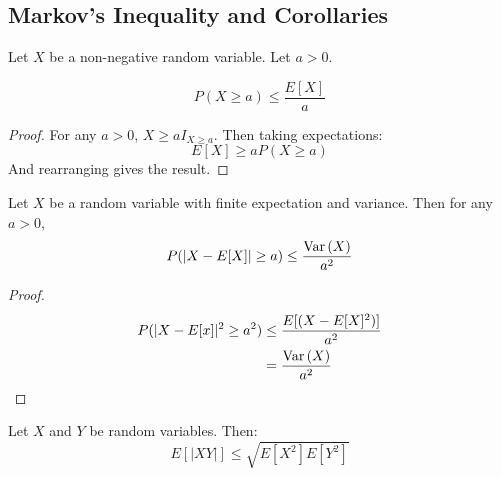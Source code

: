 \documentclass[../Main.tex]{subfiles}
\begin{document}
\subsection{Markov's Inequality and Corollaries}
\begin{theorem}
    Let $X$ be a non-negative random variable. Let $a > 0$.\par
    \begin{equation*}
        P(X \geq a) \leq \frac{E[X]}{a}
    \end{equation*}
\end{theorem}
\begin{proof}
    For any $a > 0$, $X \geq a I_{X \geq a}$. Then taking expectations:
    \begin{equation*}
        E[X] \geq a P(X \geq a)
    \end{equation*}
    And rearranging gives the result.
\end{proof}
\begin{lemma}
    Let $X$ be a random variable with finite expectation and variance. Then for any $a > 0$,
    \begin{equation*}
        P(|X - E[X]| \geq a) \leq \frac{\operatorname{Var}{(X)}}{a^2}
    \end{equation*}
\end{lemma}
\begin{proof}
    \begin{align*}
        P(|X - E[x]|^2 \geq a^2) &\leq \frac{E[(X - E[X]^2)]}{a^2} \\
        &= \frac{\operatorname{Var}{(X)}}{a^2}
    \end{align*}
\end{proof}
\begin{theorem}
    Let $X$ and $Y$ be random variables. Then:
    \begin{equation*}
        E[|XY|] \leq \sqrt{E[X^2]E[Y^2]}
    \end{equation*}
\end{theorem}
\end{document}
